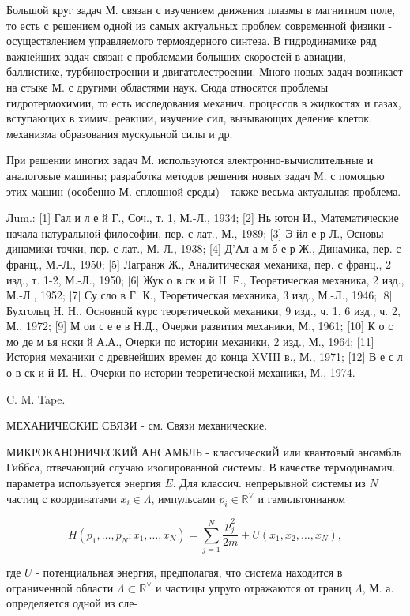 \documentclass[10pt]{article}
\begin{document}
Большой круг задач М. связан с изучением движения плазмы в магнитном поле, то есть с решением одной из самых актуальных проблем современной физики - осуществлением управляемого термоядерного синтеза. В гидродинамике ряд важнейших задач связан с проблемами болыших скоростей в авиации, баллистике, турбиностроении и двигателестроении. Много новых задач возникает на стыке М. с другими областями наук. Сюда относятся проблемы гидротермохимии, то есть исследования механич. процессов в жидкостях и газах, вступающих в химич. реакции, изучение сил, вызывающих деление клеток, механизма образования мускульной силы и др.



При решении многих задач М. используются электронно-вычислительные и аналоговые машины; разработка методов решения новых задач М. с помощью этих машин (особенно М. сплошной среды) - также весьма актуальная проблема.



Лum.: [1] Гал и л е й Г., Соч., т. 1, М.-Л., 1934; [2] Нь ютон И., Математические начала натуральной философии, пер. с лат., М., 1989; [3] Э йл е р Л., Основы динамики точки, пер. с лат., М.-Л., 1938; [4] Д'Ал а м б е р Ж., Динамика, пер. с франц., М.-Л., 1950; [5] Лагранж Ж., Аналитическая механика, пер. с франц., 2 изд., т. 1-2, М.-Л., 1950; [6] Жук о в ск и й Н. Е., Теоретическая механика, 2 изд., М.-Л., 1952; [7] Су сло в Г. К., Теоретическая механика, 3 изд., М.-Л., 1946; [8] Бухгольц Н. Н., Основной курс теоретической механики, 9 изд., ч. 1, 6 изд., ч. 2, М., 1972; [9] М ои с е е в Н.Д., Очерки развития механики, М., 1961; [10] К о с мо де м ья нски й А.А., Очерки по истории механики, 2 изд., М., 1964; [11] История механики с древнейших времен до конца XVIII в., М., 1971; [12] В е с л о в ск и й И. Н., Очерки по истории теоретической механики, М., 1974.



C. M. Tape.



МЕХАНИЧЕСКИЕ СВЯЗИ - см. Связи механические.



МИКРОКАНОНИЧЕСКИЙ АНСАМБЛЬ - классическиЙ или квантовый ансамбль Гиббса, отвечающий случаю изолированной системы. В качестве термодинамич. параметра используется энергия $E$. Для классич. непрерывной системы из $N$ частиц с координатами $x_{i} \in \Lambda$, импульсами $p_{i} \in \mathbb{R}^{\vee}$ и гамильтонианом



\[

H\left(p_{1}, \ldots, p_{N} ; x_{1}, \ldots, x_{N}\right)=\sum_{j=1}^{N} \frac{p_{j}^{2}}{2 m}+U\left(x_{1}, x_{2}, \ldots, x_{N}\right),

\]



где $U$ - потенциальная энергия, предполагая, что система находится в ограниченной области $\Lambda \subset \mathbb{R}^{\vee}$ и частицы упруго отражаются от границ $\Lambda$, М. а. определяется одной из сле-
\end{document}
